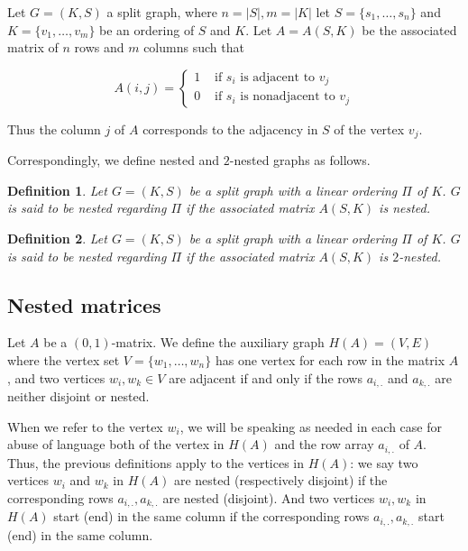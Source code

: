 \documentclass[a4paper,10pt]{report}
\theoremstyle{plain}
\theoremstyle{remark}
\theoremstyle{plain}
\newtheorem{defn}{Definition}[chapter]
\begin{document}
Let $G =(K,S)$ a split graph, where $n=|S|, m=|K|$ let $S=\{ s_1, \ldots, s_n \}$ and $K=\{ v_1, \ldots, v_m \}$ be an ordering of $S$ and $K$. 
Let $A= A(S,K)$ be the associated matrix of $n$ rows and $m$ columns such that 

\[ A\left( i,j \right) = \begin{cases} 
      1 & \mbox{ if } s_i \mbox{ is adjacent to } v_j \\
      0 & \mbox{ if } s_i \mbox{ is nonadjacent to } v_j  
   \end{cases}
\]

Thus the column $j$ of $A$ corresponds to the adjacency in $S$ of the vertex $v_j$.

Correspondingly, we define nested and $2$-nested graphs as follows.

\begin{defn} \label{def_nested}
	Let $G = (K,S)$ be a split graph with a linear ordering $\Pi$ of $K$. 
	$G$ is said to be \emph{nested} regarding $\Pi$ if the associated matrix $A(S,K)$ is nested.
\end{defn}

\begin{defn} \label{def_2nested}
		Let $G = (K,S)$ be a split graph with a linear ordering $\Pi$ of $K$. 
	$G$ is said to be \emph{nested} regarding $\Pi$ if the associated matrix $A(S,K)$ 
	is $2$-nested.
\end{defn}


\subsection{Nested matrices}

Let $A$ be a $(0,1)$-matrix. We define the auxiliary graph $H(A)=(V,E)$ where the vertex set $V= \{ w_1, \ldots, w_n \}$ has one vertex for each row in the matrix $A$, 
and two vertices $w_i,w_k \in V$ are adjacent if and only if the rows $a_{i,.}$ and $a_{k,.}$ are neither disjoint or nested.
	
When we refer to the vertex $w_i$, we will be speaking as needed in each case for abuse of language both of the vertex in $H(A)$ and the row array $a_{i,.}$ of $A$. 
Thus, the previous definitions apply to the vertices in $H(A)$:
we say two vertices $w_i$ and $w_k$ in $H(A)$ are nested (respectively disjoint) if the corresponding rows $a_{i,.}, a_{k,.}$ are nested (disjoint).
And two vertices $w_i, w_k$ in $H(A)$ start (end) in the same column if the corresponding rows $a_{i,.}, a_{k,.}$ start (end) in the same column.
\end{document}
